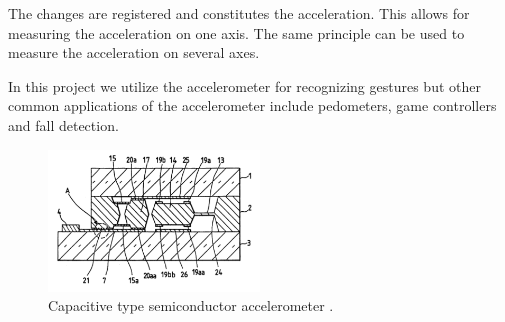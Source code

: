 The changes are registered and constitutes the acceleration. This allows for measuring the acceleration on one axis. The same principle can be used to measure the acceleration on several axes.

In this project we utilize the accelerometer for recognizing gestures but other common applications of the accelerometer include pedometers, game controllers and fall detection.

\begin{figure}
\centering
\includegraphics[width=0.5\textwidth]{images/accelerometer}
\caption{Capacitive type semiconductor accelerometer \cite{kloeck1993capacitive}.}
\label{fig:accelerometer}
\end{figure}


